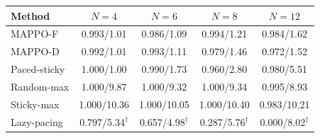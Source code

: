 \begin{tabular}{lcccc}
\toprule
Method & $N=4$ & $N=6$ & $N=8$ & $N=12$ \\
\midrule
MAPPO-F & 0.993/1.01 & 0.986/1.09 & 0.994/1.21 & 0.984/1.62 \\
MAPPO-D & 0.992/1.01 & 0.993/1.11 & 0.979/1.46 & 0.972/1.52 \\
Paced-sticky & 1.000/1.00 & 0.990/1.73 & 0.960/2.80 & 0.980/5.51 \\
Random-max & 1.000/9.87 & 1.000/9.32 & 1.000/9.34 & 0.995/8.93 \\
Sticky-max & 1.000/10.36 & 1.000/10.05 & 1.000/10.40 & 0.983/10.21 \\
Lazy-pacing & 0.797/5.34$^\dagger$ & 0.657/4.98$^\dagger$ & 0.287/5.76$^\dagger$ & 0.000/8.02$^\dagger$ \\
\bottomrule
\end{tabular}
